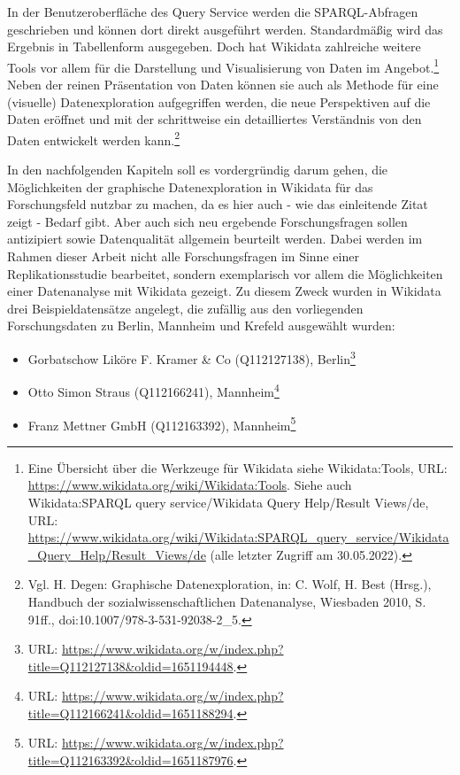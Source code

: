 In der Benutzeroberfläche des Query Service werden die SPARQL-Abfragen geschrieben und können dort direkt ausgeführt werden. Standardmäßig wird das Ergebnis in Tabellenform ausgegeben. Doch hat Wikidata zahlreiche weitere Tools vor allem für die Darstellung und Visualisierung von Daten im Angebot.\footnote{Eine Übersicht über die Werkzeuge für Wikidata siehe Wikidata:Tools, URL: \url{https://www.wikidata.org/wiki/Wikidata:Tools}. Siehe auch Wikidata:SPARQL query service/Wikidata Query Help/Result Views/de, URL: \url{https://www.wikidata.org/wiki/Wikidata:SPARQL_query_service/Wikidata_Query_Help/Result_Views/de} (alle letzter Zugriff am 30.05.2022).} Neben der reinen Präsentation von Daten können sie auch als Methode für eine (visuelle) Datenexploration aufgegriffen werden, die neue Perspektiven auf die Daten eröffnet und mit der schrittweise ein detailliertes Verständnis von den Daten entwickelt werden kann.\footnote{Vgl. H. Degen: Graphische Datenexploration, in: C. Wolf, H. Best (Hrsg.), Handbuch der sozialwissenschaftlichen Datenanalyse, Wiesbaden 2010, S. 91ff., doi:10.1007/978-3-531-92038-2\_5.} 

In den nachfolgenden Kapiteln soll es vordergründig darum gehen, die Möglichkeiten der graphische Datenexploration in Wikidata für das Forschungsfeld nutzbar zu machen, da es hier auch - wie das einleitende Zitat zeigt - Bedarf gibt. Aber auch sich neu ergebende Forschungsfragen sollen antizipiert sowie Datenqualität allgemein beurteilt werden. Dabei werden im Rahmen dieser Arbeit nicht alle Forschungsfragen im Sinne einer Replikationsstudie bearbeitet, sondern exemplarisch vor allem die Möglichkeiten einer Datenanalyse mit Wikidata gezeigt. Zu diesem Zweck wurden in Wikidata drei Beispieldatensätze angelegt, die zufällig aus den vorliegenden Forschungsdaten zu Berlin, Mannheim und Krefeld ausgewählt wurden:

\begin{itemize}
    \item Gorbatschow Liköre F. Kramer \& Co (Q112127138), Berlin\footnote{URL: \url{https://www.wikidata.org/w/index.php?title=Q112127138\&oldid=1651194448}.}
    \item Otto Simon Straus (Q112166241), Mannheim\footnote{URL: \url{https://www.wikidata.org/w/index.php?title=Q112166241\&oldid=1651188294}.}
    \item Franz Mettner GmbH (Q112163392), Mannheim\footnote{URL: \url{https://www.wikidata.org/w/index.php?title=Q112163392\&oldid=1651187976}.}
\end{itemize}

